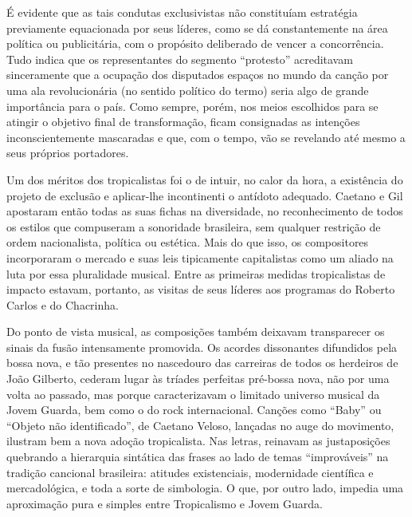 É evidente que as tais condutas exclusivistas não constituíam estratégia
previamente equacionada por seus líderes, como se dá constantemente na
área política ou publicitária, com o propósito deliberado de vencer a
concorrência. Tudo indica que os representantes do segmento ``protesto''
acreditavam sinceramente que a ocupação dos disputados espaços no mundo
da canção por uma ala revolucionária (no sentido político do termo)
seria algo de grande importância para o país. Como sempre, porém, nos
meios escolhidos para se atingir o objetivo final de transformação,
ficam consignadas as intenções inconscientemente mascaradas e que, com o
tempo, vão se revelando até mesmo a seus próprios portadores.

Um dos méritos dos tropicalistas foi o de intuir, no calor da hora, a
existência do projeto de exclusão e aplicar-lhe incontinenti o antídoto
adequado. Caetano e Gil apostaram então todas as suas fichas na
diversidade, no reconhecimento de todos os estilos que compuseram a
sonoridade brasileira, sem qualquer restrição de ordem nacionalista,
política ou estética. Mais do que isso, os compositores incorporaram o
mercado e suas leis tipicamente
capitalistas como um aliado na luta por essa pluralidade musical. Entre
as primeiras medidas tropicalistas de impacto estavam, portanto, as
visitas de seus líderes aos programas do Roberto Carlos e do Chacrinha.

Do ponto de vista musical, as composições também deixavam transparecer
os sinais da fusão intensamente promovida. Os acordes dissonantes
difundidos pela bossa nova, e tão presentes no nascedouro das carreiras
de todos os herdeiros de João Gilberto, cederam lugar às tríades
perfeitas pré-bossa nova, não por uma volta ao passado, mas porque
caracterizavam o limitado universo musical da Jovem Guarda, bem como o
do rock internacional. Canções como ``Baby'' ou ``Objeto não
identificado'', de Caetano Veloso, lançadas no auge do movimento,
ilustram bem a nova adoção tropicalista. Nas letras, reinavam as
justaposições quebrando a hierarquia sintática das frases ao lado de
temas ``improváveis'' na tradição cancional brasileira: atitudes
existenciais, modernidade científica e mercadológica, e toda a sorte de
simbologia. O que, por outro lado, impedia uma aproximação pura e
simples entre Tropicalismo e Jovem Guarda.

